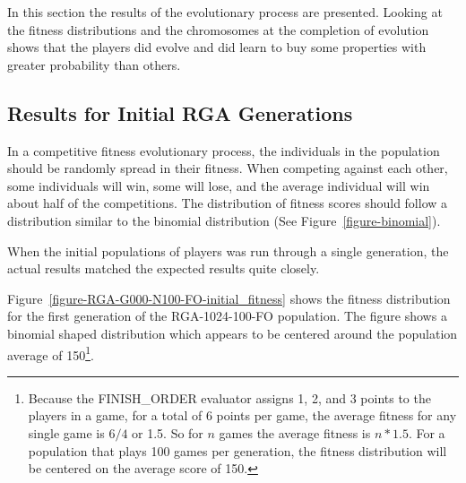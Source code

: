 In this section the results of the evolutionary process are presented. Looking at
the fitness distributions and the chromosomes at the completion of evolution
shows that the players did evolve and did learn to buy some properties with greater
probability than others.

\subsection{Results for Initial RGA Generations}

In a competitive fitness evolutionary process, the individuals in the population
should be randomly spread in their fitness. When competing against each other,
some individuals will win, some will lose, and the average individual will win
about half of the competitions. The distribution of fitness scores should follow
a distribution similar to the binomial distribution (See
Figure~\ref{figure-binomial}).

When the initial populations of players was run through a single generation, the
actual results matched the expected results quite closely.

Figure~\ref{figure-RGA-G000-N100-FO-initial_fitness} shows the fitness
distribution for the first generation of the RGA-1024-100-FO population. The
figure shows a binomial shaped distribution which appears to be centered around
the population average of 150\footnote{Because the FINISH\_ORDER evaluator
assigns 1, 2, and 3 points to the players in a game, for a total of 6 points per
game, the average fitness for any single game is \(6/4\) or 1.5. So for \(n\)
games the average fitness is \(n * 1.5\). For a population that plays 100 games
per generation, the fitness distribution will be centered on the average score
of 150.}.

